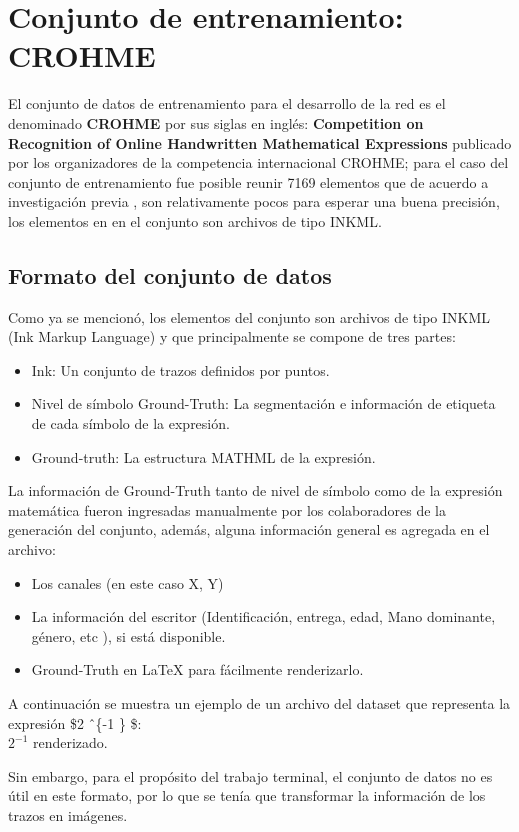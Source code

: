 \newpage
\section{Conjunto de entrenamiento: CROHME}

El conjunto de datos de entrenamiento para el desarrollo de la red es el denominado \textbf{CROHME} por sus siglas en inglés: \textbf{Competition on Recognition of Online Handwritten Mathematical Expressions} publicado por los organizadores de la competencia internacional CROHME; para el caso del conjunto de entrenamiento fue posible reunir 7169 elementos que de acuerdo a investigación previa \cite{chino}, son relativamente pocos  para esperar una buena precisión, los  elementos en en el conjunto son archivos de tipo INKML.
\subsection{Formato del conjunto de datos}

Como ya se mencionó, los elementos del conjunto son archivos de tipo INKML (Ink Markup Language) y que principalmente se compone de tres partes:

\begin{itemize}
	\item Ink: Un conjunto de trazos definidos por puntos.
	\item Nivel de símbolo Ground-Truth: La segmentación e información de etiqueta de cada símbolo de la expresión.
	\item Ground-truth: La estructura MATHML de la expresión.
\end{itemize}

La información de Ground-Truth tanto de nivel de símbolo como de la expresión matemática fueron ingresadas manualmente por los colaboradores de la generación del conjunto, además, alguna información general es agregada en el archivo:

\begin{itemize}
	\item Los canales (en este caso X, Y)
	\item La información del escritor (Identificación, entrega, edad, Mano dominante, género, etc ), si está disponible.
	\item Ground-Truth en \LaTeX{} para fácilmente renderizarlo.
\end{itemize}

A continuación se muestra un ejemplo de un archivo del dataset que representa la expresión \$2 \^\ \{-1 \} \$:\\
 $2^{-1}$ renderizado.

Sin embargo, para el propósito del trabajo terminal, el conjunto de datos no es útil en este formato, por lo que se tenía que transformar la información de los trazos en imágenes.
